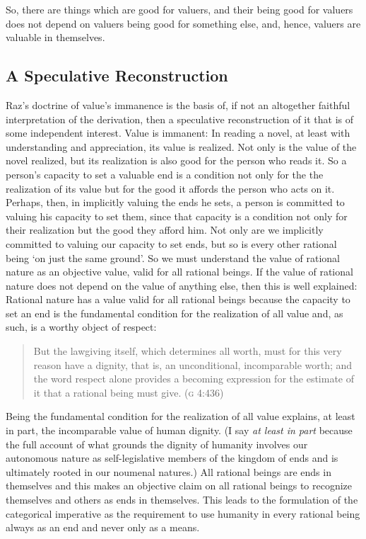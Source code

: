 \documentclass[a4paper,12pt]{article}
\begin{document}
So, there are things which are good for valuers, and their being good for valuers does not depend on valuers being good for something else, and, hence, valuers are valuable in themselves.


\subsection{A Speculative Reconstruction}\label{sub:a_speculative_reconstruction} %

Raz's doctrine of value's immanence is the basis of, if not an altogether faithful interpretation of the derivation, then a speculative reconstruction of it that is of some independent interest. Value is immanent: In reading a novel, at least with understanding and appreciation, its value is realized. Not only is the value of the novel realized, but its realization is also good for the person who reads it. So a person's capacity to set a valuable end is a condition not only for the the realization of its value but for the good it affords the person who acts on it. Perhaps, then, in implicitly valuing the ends he sets, a person is committed to valuing his capacity to set them, since that capacity is a condition not only for their realization but the good they afford him. Not only are we implicitly committed to valuing our capacity to set ends, but so is every other rational being `on just the same ground'. So we must understand the value of rational nature as an objective value, valid for all rational beings. If the value of rational nature does not depend on the value of anything else, then this is well explained: Rational nature has a value valid for all rational beings because the capacity to set an end is the fundamental condition for the realization of all value and, as such, is a worthy object of respect: 
\begin{quote}
	But the lawgiving itself, which determines all worth, must for this very reason have a dignity, that is, an unconditional, incomparable worth; and the word respect alone provides a becoming expression for the estimate of it that a rational being must give. (\textsc{g} 4:436) 
\end{quote}
Being the fundamental condition for the realization of all value explains, at least in part, the incomparable value of human dignity. (I say \emph{at least in part} because the full account of what grounds the dignity of humanity involves our autonomous nature as self-legislative members of the kingdom of ends and is ultimately rooted in our noumenal natures.) All rational beings are ends in themselves and this makes an objective claim on all rational beings to recognize themselves and others as ends in themselves. This leads to the formulation of the categorical imperative as the requirement to use humanity in every rational being always as an end and never only as a means.
\end{document}
